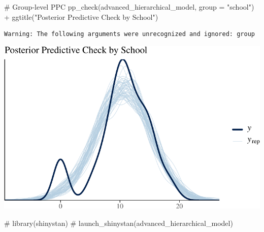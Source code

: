\documentclass[
  10pt,
]{article}
\newenvironment{Shaded}{\begin{snugshade}}{\end{snugshade}}
\newcommand{\AttributeTok}[1]{\textcolor[rgb]{0.40,0.45,0.13}{#1}}
\newcommand{\CommentTok}[1]{\textcolor[rgb]{0.37,0.37,0.37}{#1}}
\newcommand{\FunctionTok}[1]{\textcolor[rgb]{0.28,0.35,0.67}{#1}}
\newcommand{\NormalTok}[1]{\textcolor[rgb]{0.00,0.23,0.31}{#1}}
\newcommand{\SpecialCharTok}[1]{\textcolor[rgb]{0.37,0.37,0.37}{#1}}
\newcommand{\StringTok}[1]{\textcolor[rgb]{0.13,0.47,0.30}{#1}}
\begin{document}
\begin{Shaded}
\begin{Highlighting}[]
\CommentTok{\# Group{-}level PPC}
\FunctionTok{pp\_check}\NormalTok{(advanced\_hierarchical\_model, }\AttributeTok{group =} \StringTok{"school"}\NormalTok{) }\SpecialCharTok{+}
  \FunctionTok{ggtitle}\NormalTok{(}\StringTok{"Posterior Predictive Check by School"}\NormalTok{)}
\end{Highlighting}
\end{Shaded}

\begin{verbatim}
Warning: The following arguments were unrecognized and ignored: group
\end{verbatim}

\includegraphics{551-HW-Q3_files/figure-pdf/unnamed-chunk-9-1.pdf}

\begin{Shaded}
\begin{Highlighting}[]
\CommentTok{\# library(shinystan)}
\CommentTok{\# launch\_shinystan(advanced\_hierarchical\_model)}
\end{Highlighting}
\end{Shaded}

\begin{Shaded}
\end{Shaded}
\end{document}
